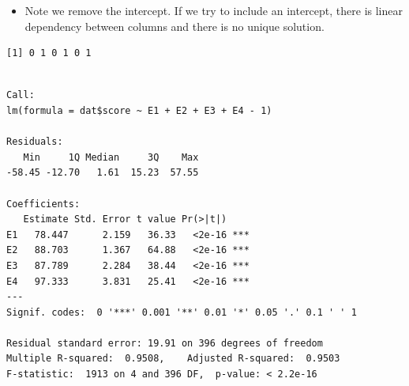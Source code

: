 \documentclass[
  letterpaper,
  DIV=11,
  numbers=noendperiod]{scrreprt}
\newenvironment{Shaded}{\begin{snugshade}}{\end{snugshade}}
\newcommand{\CommentTok}[1]{\textcolor[rgb]{0.37,0.37,0.37}{#1}}
\newcommand{\DecValTok}[1]{\textcolor[rgb]{0.68,0.00,0.00}{#1}}
\newcommand{\FunctionTok}[1]{\textcolor[rgb]{0.28,0.35,0.67}{#1}}
\newcommand{\NormalTok}[1]{\textcolor[rgb]{0.00,0.23,0.31}{#1}}
\newcommand{\OtherTok}[1]{\textcolor[rgb]{0.00,0.23,0.31}{#1}}
\newcommand{\SpecialCharTok}[1]{\textcolor[rgb]{0.37,0.37,0.37}{#1}}
\providecommand{\tightlist}{%
  \setlength{\itemsep}{0pt}\setlength{\parskip}{0pt}}\usepackage{longtable,booktabs,array}
\begin{document}
\begin{itemize}
\tightlist
\item
  Note we remove the intercept. If we try to include an intercept, there
  is linear dependency between columns and there is no unique solution.
\end{itemize}

\begin{Shaded}
\end{Shaded}

\begin{verbatim}
[1] 0 1 0 1 0 1
\end{verbatim}

\begin{Shaded}
\end{Shaded}

\begin{verbatim}

Call:
lm(formula = dat$score ~ E1 + E2 + E3 + E4 - 1)

Residuals:
   Min     1Q Median     3Q    Max 
-58.45 -12.70   1.61  15.23  57.55 

Coefficients:
   Estimate Std. Error t value Pr(>|t|)    
E1   78.447      2.159   36.33   <2e-16 ***
E2   88.703      1.367   64.88   <2e-16 ***
E3   87.789      2.284   38.44   <2e-16 ***
E4   97.333      3.831   25.41   <2e-16 ***
---
Signif. codes:  0 '***' 0.001 '**' 0.01 '*' 0.05 '.' 0.1 ' ' 1

Residual standard error: 19.91 on 396 degrees of freedom
Multiple R-squared:  0.9508,    Adjusted R-squared:  0.9503 
F-statistic:  1913 on 4 and 396 DF,  p-value: < 2.2e-16
\end{verbatim}
\end{document}
